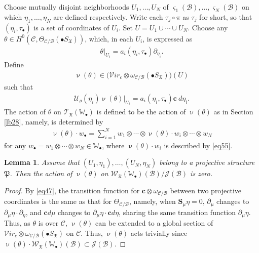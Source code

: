 \documentclass[12pt,a4paper,notitlepage]{article}
\theoremstyle{definition}
\theoremstyle{plain}
\newtheorem{lm}[df]{Lemma}
\newcommand{\fk}{\mathfrak}
\newcommand{\mc}{\mathcal}
\newcommand{\scr}{\mathscr}
\newcommand{\sgm}{\varsigma}
\newcommand{\SX}{S_{\fk X}}
\newcommand{\blt}{\bullet}
\newcommand{\Wbb}{\mathbb W}
\newcommand{\cbf}{\mathbf c}
\newcommand{\svir}{\mathcal V\!\mathit{ir}}
\newcommand{\Sbf}{\mathbf{S}}
\numberwithin{equation}{section}
\begin{document}
Choose mutually disjoint neighborhoods $U_1,\dots,U_N$ of $\sgm_1(\mc B),\dots,\sgm_N(\mc B)$ on which $\eta_1,\dots,\eta_N$ are defined respectively. Write each $\tau_j\circ\pi$ as $\tau_j$ for short, so that $(\eta_i,\tau_\blt)$ is a set of coordinates of $U_i$. Set $U=U_1\cup\cdots\cup U_N$. Choose any $\theta\in H^0(\mc C,\Theta_{\mc C/\mc B}(\blt\SX))$, which, in each $U_i$, is expressed as
\begin{align}
\theta|_{U_i}=a_i(\eta_i,\tau_\blt)\partial_{\eta_i}.\label{eq52}
\end{align}
Define 
\begin{align*}
\upnu(\theta)\in \big(\svir_c\otimes \omega_{\mc C/\mc B}(\blt S_{\fk X})\big)(U)
\end{align*}
such that
\begin{align}
\mc U_\varrho(\eta_i)\upnu(\theta)|_{U_i}=a_i(\eta_i,\tau_\blt)\cbf~d{\eta_i}.\label{eq54}
\end{align}
The action of $\theta$ on $\scr T_{\fk X}(\Wbb_\blt)$ is defined to be the action of $\upnu(\theta)$ as in Section \ref{lb28}, namely, is determined by
\begin{align}
\upnu(\theta)\cdot w_\blt=\sum_{i=1}^N w_1\otimes\cdots\otimes \upnu(\theta)\cdot w_i\otimes\cdots \otimes w_N
\end{align}
for any $w_\blt=w_1\otimes\cdots\otimes w_N\in\Wbb_\blt$, where $\upnu(\theta)\cdot w_i$ is described by \eqref{eq55}. 


\begin{lm}\label{lb29}
Assume that $(U_1,\eta_1),\dots,(U_N,\eta_N)$ belong to a projective structure $\fk P$.  Then the action of $\upnu(\theta)$ on $\scr W_{\fk X}(\Wbb_\blt)(\mc B)/\scr J(\mc B)$ is zero.
\end{lm}

\begin{proof}
By \eqref{eq47}, the transition function for $\cbf \otimes \omega_{\mc C/\mc B}$  between two projective coordinates is the same as that for $\Theta_{\mc C/\mc B}$, namely, when $\Sbf_\mu\eta=0$, $\partial_\mu$ changes to $\partial_\mu\eta\cdot \partial_\eta$, and $\cbf d\mu$ changes to $\partial_\mu\eta\cdot \cbf d\eta$, sharing the same transition function $\partial_\mu\eta$. Thus, as $\theta$ is over $\mc C$, $\upnu(\theta)$ can be extended to a global section of $\svir_c\otimes \omega_{\mc C/\mc B}(\blt S_{\fk X})$ on $\mc C$.  Thus, $\upnu(\theta)$ acts trivially since $\upnu(\theta)\cdot \scr W_{\fk X}(\Wbb_\blt)(\mc B)\subset\scr J(\mc B)$.
\end{proof}
\end{document}

